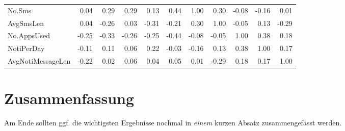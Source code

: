 \begin{landscape}
\begin{table}[]
{\begin{tabular}{@{}l|rrrrrrrrrr@{}}
\multicolumn{1}{|l|}{No.Sms}                  & \cellcolor[HTML]{4FD22F}0.04  & 0.29                          & 0.29                             & 0.13                              & 0.44                           & 1.00                         & 0.30                           & -0.08                            & -0.16                           & 0.01                                   \\ \cmidrule(r){1-1}
\multicolumn{1}{|l|}{AvgSmsLen}               & \cellcolor[HTML]{4FD22F}0.04  & -0.26                         & 0.03                             & -0.31                             & -0.21                          & 0.30                         & 1.00                           & -0.05                            & 0.13                            & -0.29                                  \\ \cmidrule(r){1-1}
\multicolumn{1}{|l|}{No.AppsUsed}             & \cellcolor[HTML]{4FD22F}-0.25 & -0.33                         & -0.26                            & -0.25                             & -0.44                          & -0.08                        & -0.05                          & 1.00                             & 0.38                            & 0.18                                   \\ \cmidrule(r){1-1}
\multicolumn{1}{|l|}{NotiPerDay}              & \cellcolor[HTML]{4FD22F}-0.11 & 0.11                          & 0.06                             & 0.22                              & -0.03                          & -0.16                        & 0.13                           & 0.38                             & 1.00                            & 0.17                                   \\ \cmidrule(r){1-1}
\multicolumn{1}{|l|}{AvgNotiMessageLen}       & \cellcolor[HTML]{4FD22F}-0.22 & 0.02                          & 0.06                             & 0.04                              & 0.05                           & 0.01                         & -0.29                          & 0.18                             & 0.17                            & 1.00                                   \\ \bottomrule
\end{tabular}%
}
\end{table}
\end{landscape}

\section{Zusammenfassung}
\label{ch:Evaluierung:sec:zusammenfassung}

Am Ende sollten ggf. die wichtigsten Ergebnisse nochmal in \emph{einem}
kurzen Absatz zusammengefasst werden.

